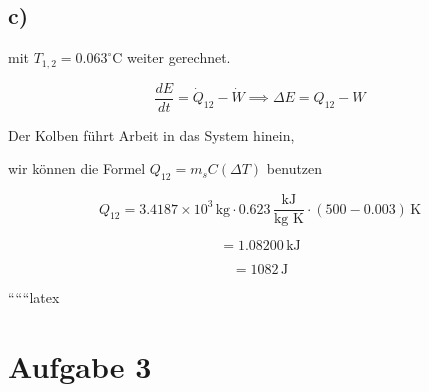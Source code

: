 

\subsection*{c)}

mit $T_{1,2} = 0.063^\circ \text{C}$ weiter gerechnet.

\[
\frac{dE}{dt} = \dot{Q}_{12} - \dot{W} \implies \Delta E = Q_{12} - W
\]

Der Kolben führt Arbeit in das System hinein,

wir können die Formel $Q_{12} = m_s C (\Delta T)$ benutzen

\[
Q_{12} = 3.4187 \times 10^3 \, \text{kg} \cdot 0.623 \, \frac{\text{kJ}}{\text{kg K}} \cdot (500 - 0.003) \, \text{K}
\]

\[
= 1.08200 \, \text{kJ}
\]

\[
= 1082 \, \text{J}
\]

``````latex


\section*{Aufgabe 3}